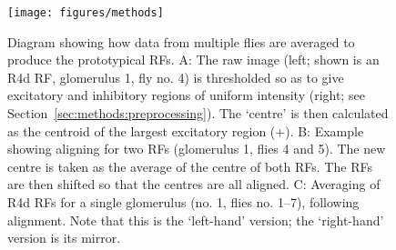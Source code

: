 \begin{figure}
\centering
\texttt{[image: figures/methods]}
\caption{Diagram showing how data from multiple flies are averaged to produce the prototypical \acp{RF}.
A: The raw image (left; shown is an R4d \ac{RF}, glomerulus 1, fly no. 4) is thresholded so as to give excitatory and inhibitory regions of uniform intensity (right; see Section~\ref{sec:methods:preprocessing}). The `centre' is then calculated as the centroid of the largest excitatory region (+).
B: Example showing aligning for two RFs (glomerulus 1, flies 4 and 5). The new centre is taken as the average of the centre of both \acp{RF}. The \acp{RF} are then shifted so that the centres are all aligned.
C: Averaging of R4d RFs for a single glomerulus (no. 1, flies no. 1--7), following alignment. Note that this is the `left-hand' version; the `right-hand' version is its mirror.}
\label{fig:averagekern}
\end{figure}

